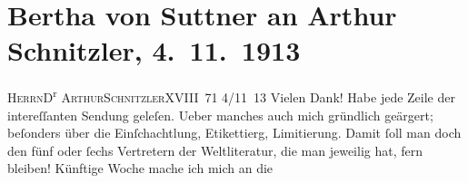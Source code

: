 

         
         \renewcommand{\erwaehntePersonen}{Personen: Géza Baracs, Bertha von Suttner}
         \renewcommand{\erwaehnteOrte}{Orte: I., Innere Stadt, Sternwartestraße, Wien, XVIII., Währing}
         \renewcommand{\erwaehnteWerke}{}
               \section[Bertha von Suttner an Arthur Schnitzler, 4. 11. 1913]{ Bertha von Suttner an Arthur Schnitzler, 4. 11. 1913}\nopagebreak{}\rehead{ }\begin{ledgroupsized}[t]{13cm}\normalsize\beginnumbering \toendnotes[C]{\smallbreak\pagebreak[2]} 
\toendnotes[C]{\smallbreak}\pstart{}{\pb}\textsc{Herrn}\pend{}\pstart{}D\textsuperscript{r}{ }\textsc{Arthur}\pend{}\pstart{}\textsc{Schnitzler}\pend{}\pstart{}XVIII\pend{}\pstart{}\textsc{\label{K_L02156-1v}\label{K_L02156-1h} 71}\pend{}{\bigskip}\pstart
           \centering{}{\pb}4/11 13\pend
           \pstart
           Vielen Dank! Habe jede Zeile der intereſſanten Sendung geleſen. Ueber manches auch
               mich gründlich geärgert; beſonders über die Einſchachtlung, Etikettierg, Limitierung.
               Damit ſoll man doch den fünf oder ſechs Vertretern der Weltliteratur, die man
               jeweilig hat, fern bleiben!\pend
           \pstart
           Künftige Woche mache ich mich an die \label{K_L02156-2v}
\end{ledgroupsized}

